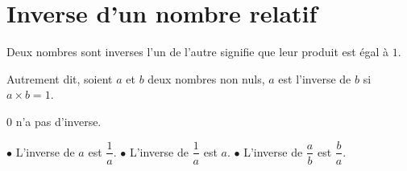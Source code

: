 \documentclass[a4paper,10pt]{report}
\begin{document}
\section{Inverse d'un nombre relatif}

\begin{defn}
Deux nombres sont inverses l'un de l'autre signifie que leur produit est égal à $1$.

\noindent Autrement dit, soient $a$ et $b$ deux nombres non nuls, $a$ est l'inverse de $b$ si $a \times b = 1$.
\end{defn}

\begin{ex}
\noindent\grandscarreaux{\linewidth}{3.2cm}
\end{ex}

\begin{rem}

\vspace{-4.5mm} \hspace{3cm}$0$ n'a pas d'inverse.
\end{rem}

\begin{prop}
$\bullet$ L'inverse de $a$ est $\dfrac{1}{a}$. \hspace{3cm} $\bullet$ L'inverse de $\dfrac{1}{a}$ est $a$. \hspace{3cm} $\bullet$ L'inverse de $\dfrac{a}{b}$ est $\dfrac{b}{a}$.
\end{prop}
\end{document}
